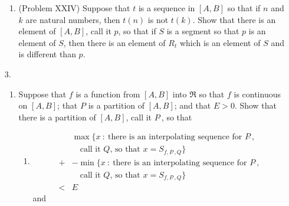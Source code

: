 \documentclass{article}
\begin{document}
\begin{itemize}
\begin{enumerate}[\hspace{1cm}(a.)]
      \item (Problem XXIV) Suppose that $t$ is a sequence in $[A,B]$ so that if $n$ and $k$ are natural numbers, then $t(n)$ is not $t(k)$. Show that there is an element of $[A,B]$, call it $p$, so that if $S$ is a segment so that $p$ is an element of $S$, then there is an element of $R_{t}$ which is an element of $S$ and is different than $p$.

    \end{enumerate}

  \item[3.] $\ $
    \begin{enumerate}[\hspace{1cm}(a.)]

      \item Suppose that $f$ is a function from $[A,B]$ into $\Re$ so that $f$ is continuous on $[A,B]$; that $P$ is a partition of $[A,B]$; and that $E > 0$. Show that there is a partition of $[A,B]$, call it $P\hat{\ }$, so that
      
        \begin{enumerate}[\hspace{1cm}(i.)]

          \item
            \begin{align*}
                 \ & \max \{ x \ : \ \text{there is an interpolating sequence for $P\hat{\ }$, } 
                \\ & \quad \text{call it $Q$, so that $x = S_{f, P\hat{\ }, Q}$} \}
              \\ + & -\min \{ x \ : \ \text{there is an interpolating sequence for $P\hat{\ }$, } 
                \\ & \quad \text{call it $Q$, so that $x = S_{f, P\hat{\ }, Q}$} \}
              \\ < & E
            \end{align*}
            and
          

\end{enumerate}
\end{enumerate}
\end{itemize}
\end{document}
